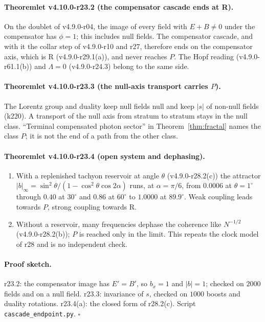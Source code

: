 \paragraph{Theoremlet v4.10.0-r23.2 (the compensator cascade ends at R).}
On the doublet of v4.9.0-r04, the image of every field with \(E+B\ne0\) under the compensator has \(\phi=1\); this includes null fields.
The compensator cascade, and with it the collar step of v4.9.0-r10 and r27, therefore ends on the compensator axis, which is R
(v4.9.0-r29.1(a)), and never reaches \(P\).  The Hopf reading (v4.9.0-r61.1(b)) and \(\Lambda=0\) (v4.9.0-r24.3) belong to the same side.

\paragraph{Theoremlet v4.10.0-r23.3 (the null-axis transport carries \(P\)).}
The Lorentz group and duality keep null fields null and keep \(|s|\) of non-null fields (k220).  A transport of the null axis from
stratum to stratum stays in the null class.  ``Terminal compensated photon sector'' in Theorem~\ref{thm:fractal} names the class \(P\); it is
not the end of a path from the other class.

\paragraph{Theoremlet v4.10.0-r23.4 (open system and dephasing).}
\begin{enumerate}[leftmargin=2em]
\item[(a)] With a replenished tachyon reservoir at angle \(\theta\) (v4.9.0-r28.2(c)) the attractor
\(|b|_\infty=\sin^2\theta/(1-\cos^2\theta\cos2\alpha)\) runs, at \(\alpha=\pi/6\), from \(0.0006\) at \(\theta=1^\circ\) through \(0.40\) at \(30^\circ\) and \(0.86\)
at \(60^\circ\) to \(1.0000\) at \(89.9^\circ\).  Weak coupling leads towards \(P\), strong coupling towards R.
\item[(b)] Without a reservoir, many frequencies dephase the coherence like \(N^{-1/2}\) (v4.9.0-r28.2(b)); \(P\) is reached only in the limit.
This repeats the clock model of r28 and is no independent check.
\end{enumerate}

\paragraph{Proof sketch.}
r23.2: the compensator image has \(E'=B'\), so \(b_x=1\) and \(|b|=1\); checked on \(2000\) fields and on a null field.  r23.3: invariance
of \(s\), checked on \(1000\) boosts and duality rotations.  r23.4(a): the closed form of r28.2(c).  Script
\texttt{cascade\_\allowbreak endpoint.py}.  \(\square\)

